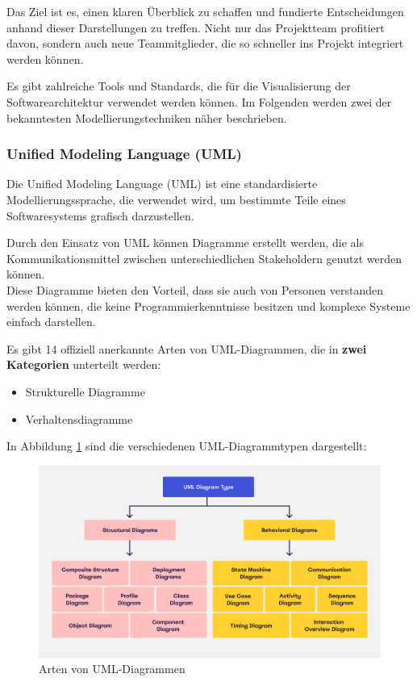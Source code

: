     Das Ziel ist es, einen klaren Überblick zu schaffen und fundierte Entscheidungen anhand dieser Darstellungen zu treffen.
    Nicht nur das Projektteam profitiert davon, sondern auch neue Teammitglieder, die so schneller ins Projekt integriert werden können.

    Es gibt zahlreiche Tools und Standards, die für die Visualisierung der Softwarearchitektur verwendet werden können.
    Im Folgenden werden zwei der bekanntesten Modellierungstechniken näher beschrieben.
    \cite{EA:Web12, EA:Web13, EA:Web14}



    \subsubsection{Unified Modeling Language (UML)} \label{UML}

    Die Unified Modeling Language (UML) ist eine standardisierte Modellierungssprache, die verwendet wird, um bestimmte Teile eines Softwaresystems grafisch darzustellen.

    Durch den Einsatz von UML können Diagramme erstellt werden, die als Kommunikationsmittel zwischen unterschiedlichen Stakeholdern genutzt werden können. \\
    Diese Diagramme bieten den Vorteil, dass sie auch von Personen verstanden werden können, die keine Programmierkenntnisse besitzen und komplexe Systeme einfach darstellen.
    \cite{EA:Web18, EA:Web19}

    Es gibt 14 offiziell anerkannte Arten von UML-Diagrammen, die in \textbf{zwei Kategorien} unterteilt werden:
    \begin{itemize}
        \item Strukturelle Diagramme
        \item Verhaltensdiagramme
    \end{itemize}

    In Abbildung \ref{fig:uml-diagrams} sind die verschiedenen UML-Diagrammtypen dargestellt:

    \begin{figure}[H]
        \centering
        \includegraphics[width=1\linewidth]{images//EA/uml-diagrams.png}
        \caption{Arten von UML-Diagrammen \\ \cite{EA:Web17}}
        \label{fig:uml-diagrams}
    \end{figure}

